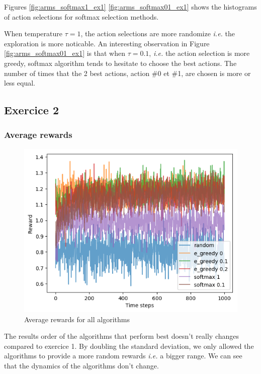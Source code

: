 \documentclass[letterpaper]{article}
\begin{document}
Figures \ref{fig:arms_softmax1_ex1} \ref{fig:arms_softmax01_ex1}
shows the histograms of action selections
for softmax selection methods.

When temperature $\tau = 1$, the action selections are more randomize
\textit{i.e.} the exploration is more noticable. An interesting observation
in Figure \ref{fig:arms_softmax01_ex1}
is that when $\tau = 0.1$, \textit{i.e.}
the action selection is more greedy, softmax
algorithm tends to hesitate to choose the best actions. The
number of times that the 2 best actions,
action \#0 et \#1, are chosen is more or less equal.


\subsection{Exercice 2}

\subsubsection{Average rewards}

\begin{figure}[H]
    \centering
    \includegraphics[width=.7\linewidth]{images/assign3/ex2/rewards}
    \caption{Average rewards for all algorithms}
    \label{fig:rewards_ex2}
\end{figure}

The results order of the algorithms that perform best doesn't really changes
compared to exercice 1.
By doubling the standard deviation, we only allowed the algorithms to
provide a more random rewards \textit{i.e.} a bigger range. We can see
that the dynamics of the algorithms don't change.

\paragraph{}
\end{document}
